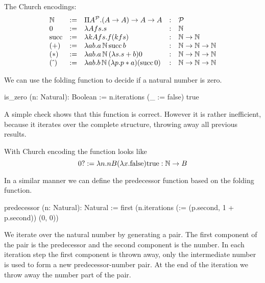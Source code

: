 \noindent The Church encodings:
$$
%
\begin{array}{lllll}

  \Natural & :=
  & \Pi A^\Prop . (A \to A)  \to A \to A
  &:
  & \Prop

  \\

  0 & :=
  & \lambda A f s . s
  &:
  & \Natural

  \\

  \text{succ} & :=
  & \lambda k A f s . f (k f s)
  &:
  & \Natural \to \Natural

  \\

  (+) & :=
  & \lambda a b. a\, \Natural\,\text{succ}\, b
  &:
  & \Natural \to \Natural \to \Natural

  \\

  (*) & :=
  & \lambda a b. a\, \Natural\, (\lambda s. s + b) 0
  &:
  & \Natural \to \Natural \to \Natural

  \\

  (\caret) & :=
  & \lambda a b. b\, \Natural\, (\lambda p. p * a) (\text{succ}\, 0)
  &:
  & \Natural \to \Natural \to \Natural
\end{array}
$$


We can use the folding function to decide if a natural number is zero.

\begin{alba}
  is_zero (n: Natural): Boolean :=
    n.iterations (\_ := false) true
\end{alba}

A simple check shows that this function is correct. However it is rather
inefficient, because it iterates over the complete structure, throwing away
all previous results.

With Church encoding the function looks like
$$
0? := \lambda n. n B (\lambda x . \text{false}) \text{true} : {\mathbb{N}} \to B
$$


In a similar manner we can define the predecessor function based on the
folding function.

\begin{alba}
  predecessor (n: Natural): Natural :=
    first (n.iterations (\p := (p.second, 1 + p.second)) (0, 0))
\end{alba}

We iterate over the natural number by generating a pair. The first component
of the pair is the predecessor and the second component is the number. In each
iteration step the first component is thrown away, only the intermediate
number is used to form a new predecessor-number pair. At the end of the
iteration we throw away the number part of the pair.

